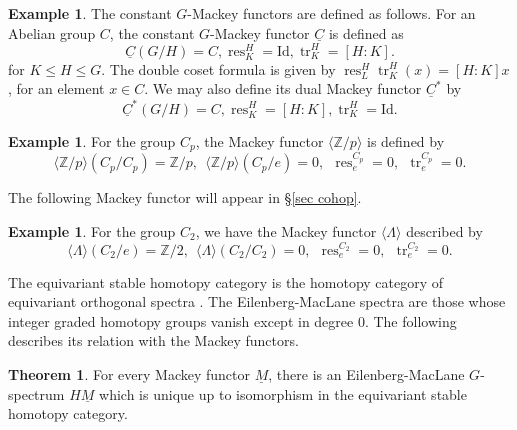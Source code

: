 \documentclass[a4paper,leqno,11pt]{amsart}
\theoremstyle{plain}
\theoremstyle{definition}
\newtheorem{exam}[theorem]{Example}
\newtheorem{thm}[theorem]{Theorem}
\theoremstyle{remark}
\theoremstyle{definition}
\newcommand{\Z}{{\mathbb{Z}}}
\newcommand\tr{\operatorname{tr}}
\newcommand{\Id}{\mbox{Id}}
\newcommand{\res}{\mathit{res}}
\newcommand{\uM}{\underline{M}}
\def\Z{\mathbb{Z}}
\numberwithin{equation}{section}
\renewcommand{\res}{\operatorname{res}}
\begin{document}
	\begin{exam}
		The constant $G$-Mackey functors are defined as follows. For an Abelian group $ C $,  the constant $G$-Mackey functor $\underline{C}$ is defined as
		\[
		\underline{C}(G/H)=C, \res^H_K=\Id, \tr^H_K=[H:K].
		\]
		for $ K\le H\le G $. The double coset formula is given by  $  \res^H_L \tr^H_K(x)=[H:K]x$, for an element $x\in C  $. We may also define its dual Mackey functor  $\underline{C}^*$ by
		\[
		\underline{C}^*(G/H)=C, \res^H_K=[H:K], \tr^H_K=\Id.
		\]
	\begin{exam}
		For the group $ C_p $,  the  Mackey functor $ \langle  \Z/p  \rangle  $  is defined  by 
		\[
		\langle   \Z/p  \rangle  (C_p/C_p)= \Z/p,~~\langle   \Z/p  \rangle  (C_p/e)= 0,~~ \res^{C_p}_e=0,~~ \tr^{C_p}_e = 0.
		\]
	\end{exam}
	The following  Mackey functor will appear in \S \ref{sec cohop}.
		  \begin{exam}
		  	For the group $ C_2 $, we have the  Mackey functor $ \langle  \Lambda  \rangle  $  described by 
		\[
		\langle   \Lambda  \rangle  (C_2/e)= \Z/2,~~\langle   \Lambda  \rangle  (C_2/C_2)= 0,~~ \res^{C_2}_e=0,~~ \tr^{C_2}_e = 0.
		\]
		  \end{exam}
	\end{exam}
The equivariant stable homotopy  category is the homotopy  category of equivariant orthogonal spectra  \cite{MandellMay}. The Eilenberg-MacLane spectra are those whose integer graded homotopy  groups vanish except in degree 0. The following describes its relation with the Mackey functors. 
	\begin{thm}\cite[Theorem 5.3]{GreenleesMay}
		For every Mackey functor $\uM$, there is an Eilenberg-MacLane $G$-spectrum $H\uM$ which is unique up to isomorphism in the equivariant stable homotopy category. 
	\end{thm}
\end{document}
